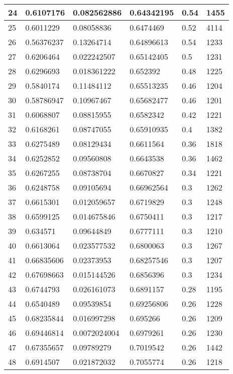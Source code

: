 \begin{longtable}{|l|l|l|l|l|l|}
24 & 0.6107176 & 0.082562886 & 0.64342195 & 0.54 & 1455 \\ \hline 
25 & 0.6011229 & 0.08058836 & 0.6474469 & 0.52 & 4114 \\ \hline 
26 & 0.56376237 & 0.13264714 & 0.64896613 & 0.54 & 1233 \\ \hline 
27 & 0.6206464 & 0.022242507 & 0.65142405 & 0.5 & 1231 \\ \hline 
28 & 0.6296693 & 0.018361222 & 0.652392 & 0.48 & 1225 \\ \hline 
29 & 0.5840174 & 0.11484112 & 0.65513235 & 0.46 & 1204 \\ \hline 
30 & 0.58786947 & 0.10967467 & 0.65682477 & 0.46 & 1201 \\ \hline 
31 & 0.6068807 & 0.08815955 & 0.6582342 & 0.42 & 1221 \\ \hline 
32 & 0.6168261 & 0.08747055 & 0.65910935 & 0.4 & 1382 \\ \hline 
33 & 0.6275489 & 0.08129434 & 0.6611564 & 0.36 & 1818 \\ \hline 
34 & 0.6252852 & 0.09560808 & 0.6643538 & 0.36 & 1462 \\ \hline 
35 & 0.6267255 & 0.08738704 & 0.6670827 & 0.34 & 1221 \\ \hline 
36 & 0.6248758 & 0.09105694 & 0.66962564 & 0.3 & 1262 \\ \hline 
37 & 0.6615301 & 0.012059657 & 0.6719829 & 0.3 & 1248 \\ \hline 
38 & 0.6599125 & 0.014675846 & 0.6750411 & 0.3 & 1217 \\ \hline 
39 & 0.634571 & 0.09644849 & 0.6777111 & 0.3 & 1210 \\ \hline 
40 & 0.6613064 & 0.023577532 & 0.6800063 & 0.3 & 1267 \\ \hline 
41 & 0.66835606 & 0.02373953 & 0.68257546 & 0.3 & 1207 \\ \hline 
42 & 0.67698663 & 0.015144526 & 0.6856396 & 0.3 & 1234 \\ \hline 
43 & 0.6744793 & 0.026161073 & 0.6891157 & 0.28 & 1195 \\ \hline 
44 & 0.6540489 & 0.09539854 & 0.69256806 & 0.26 & 1228 \\ \hline 
45 & 0.68235844 & 0.016997298 & 0.695266 & 0.26 & 1209 \\ \hline 
46 & 0.69446814 & 0.0072024004 & 0.6979261 & 0.26 & 1230 \\ \hline 
47 & 0.67355657 & 0.09789279 & 0.7019542 & 0.26 & 1442 \\ \hline 
48 & 0.6914507 & 0.021872032 & 0.7055774 & 0.26 & 1218 \\ \hline 

\end{longtable}
